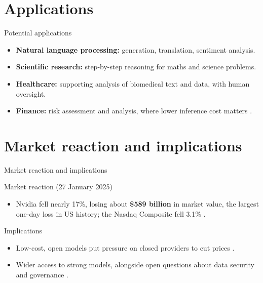 \documentclass[xcolor=svgnames]{beamer}
\begin{document}
\section{Applications}
\begin{frame}{Potential applications}
\begin{itemize}
  \item \textbf{Natural language processing:} generation, translation, sentiment analysis.
  \item \textbf{Scientific research:} step-by-step reasoning for maths and science problems.
  \item \textbf{Healthcare:} supporting analysis of biomedical text and data, with human oversight.
  \item \textbf{Finance:} risk assessment and analysis, where lower inference cost matters \cite{krause2025deepseek}.
\end{itemize}
\end{frame}

\section{Market reaction and implications}
\begin{frame}{Market reaction and implications}
\begin{block}{Market reaction (27 January 2025)}
\begin{itemize}
  \item Nvidia fell nearly 17\%, losing about \textbf{\$589 billion} in market value, the largest one-day loss in US history; the Nasdaq Composite fell 3.1\% \cite{morales2025nvidia}.
\end{itemize}
\end{block}
\begin{block}{Implications}
\begin{itemize}
  \item Low-cost, open models put pressure on closed providers to cut prices \cite{krause2025deepseek}.
  \item Wider access to strong models, alongside open questions about data security and governance \cite{sallam2025deepseek}.
\end{itemize}
\end{block}
\end{frame}
\end{document}
